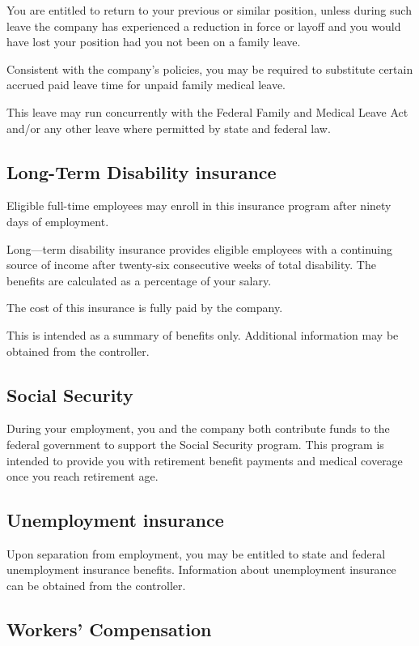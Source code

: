 \documentclass{book}
\begin{document}
You are entitled to return to your previous or similar position, unless during such leave the company has experienced a reduction in force or layoff and you would have lost your position had you not been on a family leave.

Consistent with the company's policies, you may be required to substitute certain accrued paid leave time for unpaid family medical leave.

This leave may run concurrently with the Federal Family and Medical Leave Act and/or any other leave where permitted by state and federal law.

\subsection{Long-Term Disability insurance}

Eligible full-time employees may enroll in this insurance program after ninety days of employment.

Long—term disability insurance provides eligible employees with a continuing source of income after twenty-six consecutive weeks of total disability. The benefits are calculated as a percentage of your salary.

The cost of this insurance is fully paid by the company.

This is intended as a summary of benefits only. Additional information may be obtained from the controller.

\subsection{Social Security}

During your employment, you and the company both contribute funds to the federal government to support the Social Security program. This program is intended to provide you with retirement benefit payments and medical coverage once you reach retirement age.

\subsection{Unemployment insurance}

Upon separation from employment, you may be entitled to state and federal unemployment insurance benefits. Information about unemployment insurance can be obtained from the controller.

\subsection{Workers' Compensation}
\end{document}
